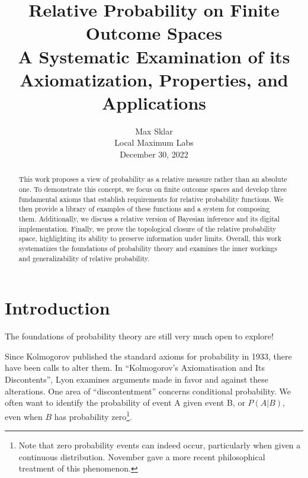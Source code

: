 \documentclass[twoside]{article}
\theoremstyle{plain}%
\theoremstyle{definition}
\theoremstyle{remark}
\begin{document}
\parindent=0in
\parskip=12pt


\title{
  Relative Probability on Finite Outcome Spaces \\
  \large{
    A Systematic Examination of its Axiomatization, Properties, and Applications
  }
}

\author{Max Sklar\\ Local Maximum Labs\\ December 30, 2022}
\date{}

\maketitle
\thispagestyle{empty}

\begin{abstract}
This work proposes a view of probability as a relative measure rather than an absolute one. To demonstrate this concept, we focus on finite outcome spaces and develop three fundamental axioms that establish requirements for relative probability functions. We then provide a library of examples of these functions and a system for composing them. Additionally, we discuss a relative version of Bayesian inference and its digital implementation. Finally, we prove the topological closure of the relative probability space, highlighting its ability to preserve information under limits. Overall, this work systematizes the foundations of probability theory and examines the inner workings and generalizability of relative probability.
\end{abstract}

\tableofcontents
\newpage

\section{Introduction}

The foundations of probability theory are still very much open to explore!

Since Kolmogorov published the standard axioms for probability\cite{kolmogorov} in 1933, there have been calls to alter them. In ``Kolmogorov's Axiomatisation and Its Discontents'', Lyon\cite{lyon} examines arguments made in favor and against these alterations. One area of ``discontentment'' concerns conditional probability. We often want to identify the probability of event A given event B, or \(P(A|B)\), even when \(B\) has probability zero\footnote{Note that zero probability events can indeed occur, particularly when given a continuous distribution. November\cite{november} gave a more recent philosophical treatment of this phenomenon.}.
\end{document}
